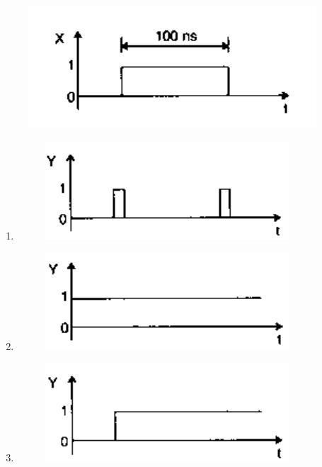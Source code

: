 \documentclass[journal]{IEEEtran}
\numberwithin{equation}{enumi}
\numberwithin{figure}{enumi}
\begin{document}
\begin{enumerate}
\begin{figure}[!ht]
{}%
\end{figure}
\newpage
\begin{figure}[!ht]
    \centering
    \includegraphics[scale=0.5]{figs/46q.png}
    \caption{}
    \label{fig:46q}
\end{figure}
\begin{enumerate}
    \item \begin{figure}[!ht]
         \centering
         \includegraphics[scale=0.4]{figs/46a.png}
         \end{figure}
    \item \begin{figure}[!ht]
         \centering
         \includegraphics[scale=0.4]{figs/46b.png}
         \end{figure}
    \item \begin{figure}[!ht]
         \centering
         \includegraphics[scale=0.4]{figs/46c.png}

\end{figure}
\end{enumerate}
\end{enumerate}
\end{document}
